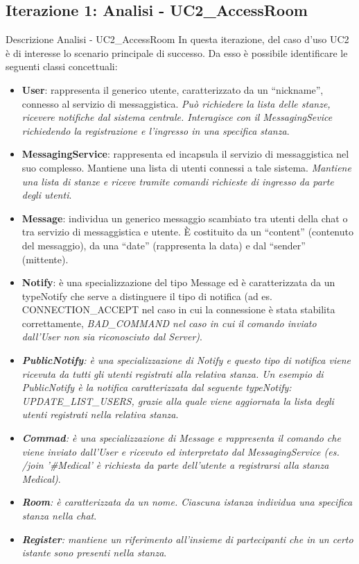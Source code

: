 \subsection{Iterazione 1: Analisi - UC2\_AccessRoom}
\begin{frame} [allowframebreaks] {Descrizione Analisi - UC2\_AccessRoom}
  In questa iterazione, del caso d’uso UC2 è di interesse lo scenario principale di successo.  Da esso è possibile identificare le seguenti classi concettuali: 
  \begin{itemize}
    \item \textbf{User}: rappresenta il generico utente, caratterizzato da un ``nickname'', connesso al servizio di messaggistica. \textit{Può richiedere la lista 
     delle stanze, ricevere notifiche dal sistema centrale. Interagisce con il MessagingSevice richiedendo la registrazione e l'ingresso in una specifica stanza}.
    \item \textbf{MessagingService}: rappresenta ed incapsula il servizio di messaggistica nel suo complesso. Mantiene una lista di utenti connessi a tale 
    sistema. \textit{Mantiene una lista di stanze e riceve tramite comandi richieste di ingresso da parte degli utenti}.
    \item \textbf{Message}: individua un generico messaggio scambiato tra utenti della chat o tra servizio di messaggistica e utente. È costituito da un ``content'' 
          (contenuto del messaggio), da una ``date'' (rappresenta la data) e dal ``sender'' (mittente).
    \item \textbf{Notify}: è una specializzazione del tipo Message ed è caratterizzata da un typeNotify che serve a distinguere il tipo di notifica (ad es. 
          CONNECTION\_ACCEPT nel caso in cui la connessione è stata stabilita correttamente, \textit{BAD\_COMMAND nel caso in cui il comando inviato dall'User non 
          sia riconosciuto dal Server)}.
    \item \textit{\textbf{PublicNotify}: è una specializzazione di Notify e questo tipo di notifica viene ricevuta da tutti gli utenti registrati alla relativa 
          stanza. Un esempio di PublicNotify è la notifica caratterizzata dal seguente typeNotify: UPDATE\_LIST\_USERS, grazie alla quale viene 
          aggiornata la lista degli utenti registrati nella relativa stanza}.
   \item  \textit{\textbf{Commad}: è una specializzazione di Message e rappresenta il comando che viene inviato dall'User e ricevuto ed interpretato dal            
          MessagingService (es. /join '\#Medical'  è richiesta da parte dell'utente a registrarsi alla stanza Medical)}.        
    \item \textit{\textbf{Room}: è caratterizzata da un nome. Ciascuna istanza individua una specifica stanza nella chat}.
    \item \textit{\textbf{Register}: mantiene un riferimento all’insieme di partecipanti che in un certo istante sono presenti nella stanza}.
   \end{itemize}
\end{frame}

